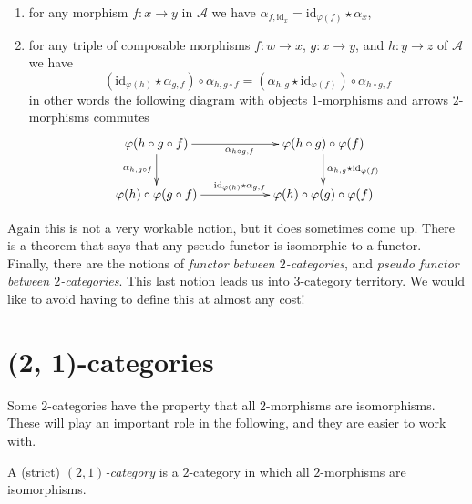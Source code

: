 \begin{definition}
\begin{enumerate}
\begin{enumerate}
$$
\xymatrix{
\varphi(x)
\rrtwocell^{\varphi(f)}_{\varphi(f)}{\ \ \ \ \text{id}_{\varphi(f)}}
& &
\varphi(y)
\rrtwocell^{\text{id}_{\varphi(y)}}_{\varphi(\text{id}_y)}{\alpha_y}
& &
\varphi(y)
}
=
\xymatrix{
\varphi(x)
\rrtwocell^{\varphi(f)}_{\varphi(\text{id}_y) \circ \varphi(f)}{\ \ \ \ \alpha_{\text{id}_y, f}}
& &
\varphi(y)
}
$$
\item for any morphism $f : x \to y$ in $\mathcal{A}$ we have
$\alpha_{f, \text{id}_x} = \text{id}_{\varphi(f)} \star \alpha_x$,
\item for any triple of composable morphisms
$f : w \to x$, $g : x \to y$, and $h : y \to z$ of $\mathcal{A}$
we have
$$
(\text{id}_{\varphi(h)} \star \alpha_{g, f})
\circ
\alpha_{h, g \circ f}
=
(\alpha_{h, g} \star \text{id}_{\varphi(f)})
\circ
\alpha_{h \circ g, f}
$$
in other words the following diagram with objects
$1$-morphisms and arrows $2$-morphisms commutes
$$
\xymatrix{
\varphi(h \circ g \circ f)
\ar[d]_{\alpha_{h, g \circ f}}
\ar[rr]_{\alpha_{h \circ g, f}}
& &
\varphi(h \circ g) \circ \varphi(f)
\ar[d]^{\alpha_{h, g} \star \text{id}_{\varphi(f)}} \\
\varphi(h) \circ \varphi(g \circ f)
\ar[rr]^{\text{id}_{\varphi(h)} \star \alpha_{g, f}}
& &
\varphi(h) \circ \varphi(g) \circ \varphi(f)
}
$$
\end{enumerate}
\end{enumerate}
\end{definition}

\noindent
Again this is not a very workable notion, but it does sometimes come up.
There is a theorem that says that any pseudo-functor is isomorphic to
a functor. Finally, there are the notions of
{\it functor between $2$-categories}, and
{\it pseudo functor between $2$-categories}.
This last notion leads us into $3$-category territory.
We would like to avoid having to define this at almost any cost!

\section{(2, 1)-categories}
\label{section-2-1-categories}

\noindent
Some $2$-categories have
the property that all $2$-morphisms are isomorphisms. These will
play an important role in the following, and they are easier to work with.

\begin{definition}
\label{definition-2-1-category}
A (strict) {\it $(2, 1)$-category} is a $2$-category in which all
$2$-morphisms are isomorphisms.
\end{definition}


